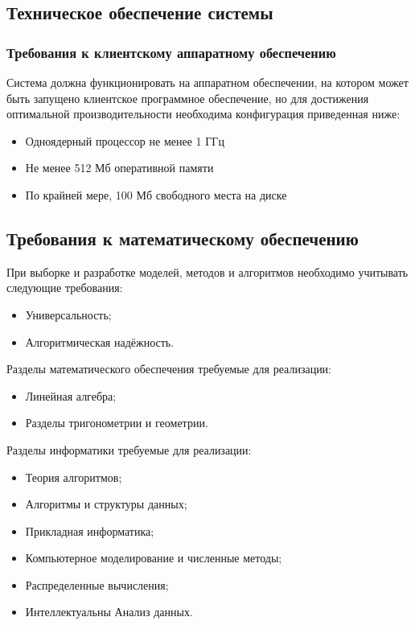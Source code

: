 \subsection{Техническое обеспечение системы}
\subsubsection{Требования к клиентскому аппаратному обеспечению}
Система должна функционировать на аппаратном обеспечении, на котором может быть запущено 
клиентское программное обеспечение, но для достижения оптимальной производительности 
необходима конфигурация приведенная ниже:
\begin{itemize}
    \item Одноядерный процессор не менее 1 ГГц
    \item Не менее 512 Мб оперативной памяти
    \item По крайней мере, 100 Мб свободного места на диске
\end{itemize}

\subsection{Требования к математическому обеспечению}
При выборке и разработке моделей, методов и алгоритмов необходимо учитывать следующие требования:
\begin{itemize}
    \item Универсальность;
    \item Алгоритмическая надёжность.
\end{itemize}

Разделы математического обеспечения требуемые для реализации:
\begin{itemize}
    \item Линейная алгебра;
    \item Разделы тригонометрии и геометрии.
\end{itemize}

Разделы информатики требуемые для реализации:
\begin{itemize}
    \item Теория алгоритмов;
    \item Алгоритмы и структуры данных;
    \item Прикладная информатика;
    \item Компьютерное моделирование и численные методы;
    \item Распределенные вычисления;
    \item Интеллектуальны Анализ данных.
\end{itemize}

